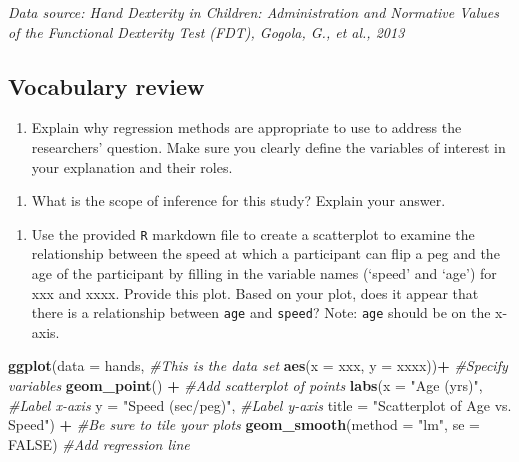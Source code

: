 \documentclass[
]{report}
\newenvironment{Shaded}{\begin{snugshade}}{\end{snugshade}}
\newcommand{\CommentTok}[1]{\textcolor[rgb]{0.56,0.35,0.01}{\textit{#1}}}
\newcommand{\DataTypeTok}[1]{\textcolor[rgb]{0.13,0.29,0.53}{#1}}
\newcommand{\KeywordTok}[1]{\textcolor[rgb]{0.13,0.29,0.53}{\textbf{#1}}}
\newcommand{\NormalTok}[1]{#1}
\newcommand{\OperatorTok}[1]{\textcolor[rgb]{0.81,0.36,0.00}{\textbf{#1}}}
\newcommand{\OtherTok}[1]{\textcolor[rgb]{0.56,0.35,0.01}{#1}}
\newcommand{\StringTok}[1]{\textcolor[rgb]{0.31,0.60,0.02}{#1}}
\providecommand{\tightlist}{%
  \setlength{\itemsep}{0pt}\setlength{\parskip}{0pt}}
\begin{document}
\emph{Data source: Hand Dexterity in Children: Administration and Normative Values of the Functional Dexterity Test (FDT), Gogola, G., et al., 2013}

\hypertarget{vocabulary-review}{%
\subsection{Vocabulary review}\label{vocabulary-review}}

\begin{enumerate}
\def\labelenumi{\arabic{enumi}.}
\tightlist
\item
  Explain why regression methods are appropriate to use to address the researchers' question. Make sure you clearly define the variables of interest in your explanation and their roles.
\end{enumerate}

\vspace{1in}

\begin{enumerate}
\def\labelenumi{\arabic{enumi}.}
\setcounter{enumi}{1}
\tightlist
\item
  What is the scope of inference for this study? Explain your answer.
\end{enumerate}

\vspace{1in}

\begin{enumerate}
\def\labelenumi{\arabic{enumi}.}
\setcounter{enumi}{2}
\tightlist
\item
  Use the provided \texttt{R} markdown file to create a scatterplot to examine the relationship between the speed at which a participant can flip a peg and the age of the participant by filling in the variable names (`speed' and `age') for xxx and xxxx. Provide this plot. Based on your plot, does it appear that there is a relationship between \texttt{age} and \texttt{speed}? Note: \texttt{age} should be on the x-axis.
\end{enumerate}

\begin{Shaded}
\begin{Highlighting}[]
    \KeywordTok{ggplot}\NormalTok{(}\DataTypeTok{data =}\NormalTok{ hands,   }\CommentTok{#This is the data set}
       \KeywordTok{aes}\NormalTok{(}\DataTypeTok{x =}\NormalTok{ xxx, }\DataTypeTok{y =}\NormalTok{ xxxx))}\OperatorTok{+}\StringTok{  }\CommentTok{#Specify variables}
\StringTok{    }\KeywordTok{geom_point}\NormalTok{() }\OperatorTok{+}\StringTok{  }\CommentTok{#Add scatterplot of points}
\StringTok{    }\KeywordTok{labs}\NormalTok{(}\DataTypeTok{x =} \StringTok{"Age (yrs)"}\NormalTok{,  }\CommentTok{#Label x-axis}
       \DataTypeTok{y =} \StringTok{"Speed (sec/peg)"}\NormalTok{,  }\CommentTok{#Label y-axis}
       \DataTypeTok{title =} \StringTok{"Scatterplot of Age vs. Speed"}\NormalTok{) }\OperatorTok{+}\StringTok{ }\CommentTok{#Be sure to tile your plots}
\StringTok{    }\KeywordTok{geom_smooth}\NormalTok{(}\DataTypeTok{method =} \StringTok{"lm"}\NormalTok{, }\DataTypeTok{se =} \OtherTok{FALSE}\NormalTok{)  }\CommentTok{#Add regression line}
\end{Highlighting}
\end{Shaded}
\end{document}
